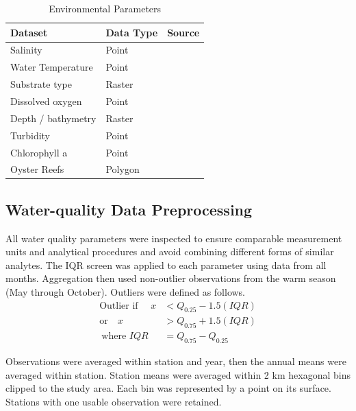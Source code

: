 \documentclass[
  review]{elsarticle}
\begin{document}
\begin{longtable}[]{@{}lll@{}}

\caption{\label{tbl-metadata}Environmental Parameters}

\tabularnewline

\toprule\noalign{}
Dataset & Data Type & Source \\
\midrule\noalign{}
\endhead
\bottomrule\noalign{}
\endlastfoot
Salinity & Point &
\citep{wqp_2026} \\
Water Temperature & Point &
\citep{wqp_2026} \\
Substrate type & Raster &
\citep{PPBEP_OysterRestoration} \\
Dissolved oxygen & Point &
\citep{wqp_2026} \\
Depth / bathymetry & Raster &
\citep{NOAA_2018} \\
Turbidity & Point &
\citep{wqp_2026} \\
Chlorophyll a & Point &
\citep{wqp_2026} \\
Oyster Reefs & Polygon &
\citep{FWC2026Oysters} \\

\end{longtable}

\subsection{Water-quality Data
Preprocessing}\label{water-quality-data-preprocessing}

All water quality parameters were inspected to ensure comparable
measurement units and analytical procedures and avoid combining
different forms of similar analytes. The IQR screen was applied to each
parameter using data from all months. Aggregation then used non-outlier
observations from the warm season (May through October). Outliers were
defined as follows. \[
\begin{aligned}
\text{Outlier if } \quad
x &< Q_{0.25} - 1.5(IQR) \\
\text{or} \quad
x &> Q_{0.75} + 1.5(IQR) \\
\
\text{where } IQR &= Q_{0.75} - Q_{0.25}
\end{aligned}
\]

Observations were averaged within station and year, then the annual
means were averaged within station. Station means were averaged within 2
km hexagonal bins clipped to the study area. Each bin was represented by
a point on its surface. Stations with one usable observation were
retained.
\end{document}

